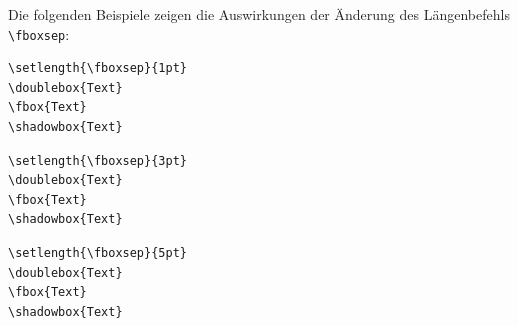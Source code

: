 \documentclass[a4paper,10pt,twoside]{scrbook}
\begin{document}
Die folgenden Beispiele zeigen die Auswirkungen der Änderung des Längenbefehls \verb!\fboxsep!:


\begin{minipage}[c]{0.5\textwidth}
\setlength{\parskip}{1em}
\setlength{\fboxsep}{1pt}
\hspace{5mm}
\hspace{5mm}
\hspace{5mm}
\hfill
\end{minipage}
\hfill
\begin{minipage}[c]{0.48\textwidth}
\setlength{\parskip}{1em}
\begin{lstlisting}[label=tabularmultirow5, style=customlatex]
\setlength{\fboxsep}{1pt}
\doublebox{Text} 
\fbox{Text}
\shadowbox{Text}
\end{lstlisting}
\end{minipage}

\begin{minipage}[c]{0.5\textwidth}
\setlength{\parskip}{1em}
\setlength{\fboxsep}{3pt}
\hspace{5mm}
\hspace{5mm}
\hspace{5mm}
\hfill
\end{minipage}
\hfill
\begin{minipage}[c]{0.48\textwidth}
\setlength{\parskip}{1em}
\begin{lstlisting}[label=tabularmultirow6, style=customlatex]
\setlength{\fboxsep}{3pt}
\doublebox{Text} 
\fbox{Text}
\shadowbox{Text}
\end{lstlisting}
\end{minipage}



\begin{minipage}[c]{0.5\textwidth}
\setlength{\parskip}{1em}
\setlength{\fboxsep}{5pt}
\hspace{5mm}
\hspace{5mm}
\hspace{5mm}
\hfill
\end{minipage}
\hfill
\begin{minipage}[c]{0.48\textwidth}
\setlength{\parskip}{1em}
\begin{lstlisting}[label=tabularmultirow7, style=customlatex]
\setlength{\fboxsep}{5pt}
\doublebox{Text} 
\fbox{Text}
\shadowbox{Text}
\end{lstlisting}
\end{minipage}
\end{document}
